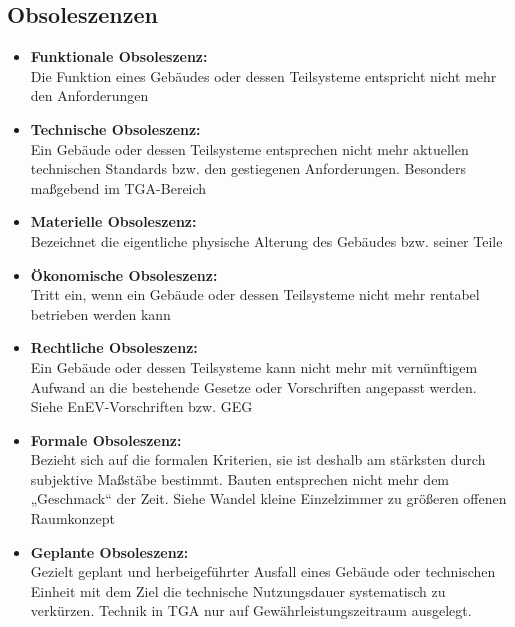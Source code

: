 \documentclass[fleqn,twoside,dvipsnames]{article}
\begin{document}
\begin{itemize}
        \subsection{Obsoleszenzen} \label{Obsoleszenzen}
                \begin{itemize}
                    \item \textbf{Funktionale Obsoleszenz:}\\
                    Die Funktion eines Gebäudes oder dessen Teilsysteme entspricht nicht
                    mehr den Anforderungen
                    \item \textbf{Technische Obsoleszenz:}\\
                    Ein Gebäude oder dessen Teilsysteme entsprechen nicht mehr aktuellen
                    technischen Standards bzw. den gestiegenen Anforderungen. Besonders maßgebend im TGA-Bereich
                    \item \textbf{Materielle Obsoleszenz:}\\
                    Bezeichnet die eigentliche physische Alterung des Gebäudes bzw. seiner
                    Teile
                    \item \textbf{Ökonomische Obsoleszenz:}\\
                    Tritt ein, wenn ein Gebäude oder dessen Teilsysteme nicht mehr rentabel
                    betrieben werden kann
                    \item \textbf{Rechtliche Obsoleszenz:}\\
                    Ein Gebäude oder dessen Teilsysteme kann nicht mehr mit vernünftigem
                    Aufwand an die bestehende Gesetze oder Vorschriften angepasst werden. Siehe EnEV-Vorschriften bzw. GEG
                    \item \textbf{Formale Obsoleszenz:}\\
                    Bezieht sich auf die formalen Kriterien, sie ist deshalb am stärksten durch
                    subjektive Maßstäbe bestimmt. Bauten entsprechen nicht mehr dem
                    „Geschmack“ der Zeit. Siehe Wandel kleine Einzelzimmer zu größeren offenen Raumkonzept
                    \item \textbf{Geplante Obsoleszenz:}\\
                    Gezielt geplant und herbeigeführter Ausfall eines Gebäude oder technischen
                    Einheit mit dem Ziel die technische Nutzungsdauer systematisch zu verkürzen. Technik in TGA nur auf Gewährleistungszeitraum ausgelegt.
                \end{itemize}

\end{itemize}
\end{document}
